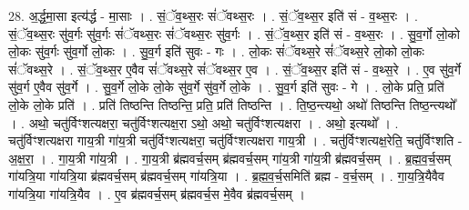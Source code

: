 \documentclass[17pt]{extarticle}
\begin{document}
28. अ॒र्द्ध॒मा॒सा इत्य॑र्द्ध - मा॒साः । . सं॒ॅव॒थ्स॒रः सं॑ॅवथ्स॒रः । . सं॒ॅव॒थ्स॒र इति॑ सं - व॒थ्स॒रः । . सं॒ॅव॒थ्स॒रः सु॑व॒र्गः सु॑व॒र्गः सं॑ॅवथ्स॒रः सं॑ॅवथ्स॒रः सु॑व॒र्गः । . सं॒ॅव॒थ्स॒र इति॑ सं - व॒थ्स॒रः । . सु॒व॒र्गो लो॒को लो॒कः सु॑व॒र्गः सु॑व॒र्गो लो॒कः । . सु॒व॒र्ग इति॑ सुवः - गः । . लो॒कः सं॑ॅवथ्स॒रे सं॑ॅवथ्स॒रे लो॒को लो॒कः सं॑ॅवथ्स॒रे । . सं॒ॅव॒थ्स॒र ए॒वैव सं॑ॅवथ्स॒रे सं॑ॅवथ्स॒र ए॒व । . सं॒ॅव॒थ्स॒र इति॑ सं - व॒थ्स॒रे । . ए॒व सु॑व॒र्गे सु॑व॒र्ग ए॒वैव सु॑व॒र्गे । . सु॒व॒र्गे लो॒के लो॒के सु॑व॒र्गे सु॑व॒र्गे लो॒के । . सु॒व॒र्ग इति॑ सुवः - गे । . लो॒के प्रति॒ प्रति॑ लो॒के लो॒के प्रति॑ । . प्रति॑ तिष्ठन्ति तिष्ठन्ति॒ प्रति॒ प्रति॑ तिष्ठन्ति । . ति॒ष्ठ॒न्त्यथो॒ अथो॑ तिष्ठन्ति तिष्ठ॒न्त्यथो᳚ । . अथो॒ चतु॑र्विꣳशत्यक्षरा॒ चतु॑र्विꣳशत्यक्ष॒रा ऽथो॒ अथो॒ चतु॑र्विꣳशत्यक्षरा । . अथो॒ इत्यथो᳚ । . चतु॑र्विꣳशत्यक्षरा गाय॒त्री गा॑य॒त्री चतु॑र्विꣳशत्यक्षरा॒ चतु॑र्विꣳशत्यक्षरा गाय॒त्री । . चतु॑र्विꣳशत्यक्ष॒रेति॒ चतु॑र्विꣳशति - अ॒क्ष॒रा॒ । . गा॒य॒त्री गा॑य॒त्री । . गा॒य॒त्री ब्र॑ह्मवर्च॒सम् ब्र॑ह्मवर्च॒सम् गा॑य॒त्री गा॑य॒त्री ब्र॑ह्मवर्च॒सम् । . ब्र॒ह्म॒व॒र्च॒सम् गा॑यत्रि॒या गा॑यत्रि॒या ब्र॑ह्मवर्च॒सम् ब्र॑ह्मवर्च॒सम् गा॑यत्रि॒या । . ब्र॒ह्म॒व॒र्च॒समिति॑ ब्रह्म - व॒र्च॒सम् । . गा॒य॒त्रि॒यैवैव गा॑यत्रि॒या गा॑यत्रि॒यैव । . ए॒व ब्र॑ह्मवर्च॒सम् ब्र॑ह्मवर्च॒स मे॒वैव ब्र॑ह्मवर्च॒सम् । \newline
\end{document}
